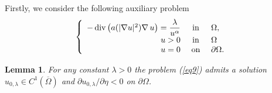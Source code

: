 \documentclass[11pt,leqno]{amsart}
\newtheorem{lemma}[theorem]{Lemma}
\begin{document}
Firstly, we consider the following auxiliary problem
\begin{equation}\label{eq9}
	\left\{
	\begin{array}{rcl}
		-\operatorname{div}\left(a(|\nabla u|^2)\nabla\,u\right)   = \displaystyle\frac{\lambda}{u^{\alpha	}}&\mbox{ in }& \Omega, \\
		u>0 &\textup{ in }& \Omega\\
		u = 0&\mbox{ on }& \partial \Omega.
	\end{array}
	\right.
\end{equation} 
\begin{lemma}\label{le2}
	For any constant $\lambda>0$ the problem (\ref{eq9})
	admits a solution $u_{0,\lambda}\in C^1(\overline{\Omega})$ and $\partial u_{0,\lambda}/\partial \eta <0$ on $\partial\Omega$.
\end{lemma}
\end{document}
